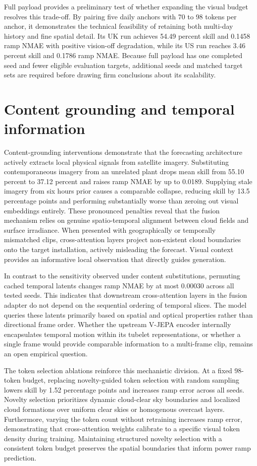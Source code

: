 Full payload provides a preliminary test of whether expanding the visual budget resolves this trade-off. By pairing five daily anchors with 70 to 98 tokens per anchor, it demonstrates the technical feasibility of retaining both multi-day history and fine spatial detail. Its UK run achieves 54.49 percent skill and 0.1458 ramp NMAE with positive vision-off degradation, while its US run reaches 3.46 percent skill and 0.1786 ramp NMAE. Because full payload has one completed seed and fewer eligible evaluation targets, additional seeds and matched target sets are required before drawing firm conclusions about its scalability.

\section{Content grounding and temporal information}

Content-grounding interventions demonstrate that the forecasting architecture actively extracts local physical signals from satellite imagery. Substituting contemporaneous imagery from an unrelated plant drops mean skill from 55.10 percent to 37.12 percent and raises ramp NMAE by up to 0.0189. Supplying stale imagery from six hours prior causes a comparable collapse, reducing skill by 13.5 percentage points and performing substantially worse than zeroing out visual embeddings entirely. These pronounced penalties reveal that the fusion mechanism relies on genuine spatio-temporal alignment between cloud fields and surface irradiance. When presented with geographically or temporally mismatched clips, cross-attention layers project non-existent cloud boundaries onto the target installation, actively misleading the forecast. Visual context provides an informative local observation that directly guides generation.

In contrast to the sensitivity observed under content substitutions, permuting cached temporal latents changes ramp NMAE by at most 0.00030 across all tested seeds. This indicates that downstream cross-attention layers in the fusion adapter do not depend on the sequential ordering of temporal slices. The model queries these latents primarily based on spatial and optical properties rather than directional frame order. Whether the upstream V-JEPA encoder internally encapsulates temporal motion within its tubelet representations, or whether a single frame would provide comparable information to a multi-frame clip, remains an open empirical question.

The token selection ablations reinforce this mechanistic division. At a fixed 98-token budget, replacing novelty-guided token selection with random sampling lowers skill by 1.52 percentage points and increases ramp error across all seeds. Novelty selection prioritizes dynamic cloud-clear sky boundaries and localized cloud formations over uniform clear skies or homogenous overcast layers. Furthermore, varying the token count without retraining increases ramp error, demonstrating that cross-attention weights calibrate to a specific visual token density during training. Maintaining structured novelty selection with a consistent token budget preserves the spatial boundaries that inform power ramp prediction.

